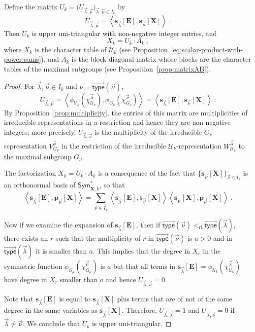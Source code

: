 \documentclass[ALCO,Unicode]{cedram}
\newcommand{\vtype}{\overrightarrow{\mathsf{type}}}
\newcommand{\XXX}{\mathbf{X}}
\newcommand{\EEE}{\mathbf{E}}
\begin{document}
\begin{prop}\label{prop:UAfactorization}
Define the matrix
$U_k = \big( U_{ \vec{\lambda}, \vec{\mu}} \big)_{\vec{\lambda}, \vec{\mu}\in I_k}$
by
\[
U_{ \vec{\lambda}, \vec{\mu}} = \left<
\mathbf{s}_{\vec{\lambda}}[\EEE], \mathbf{s}_{\vec{\mu}}[\XXX] \right>~.
\]
Then $U_k$ is upper uni-triangular with non-negative integer entries, and
\[
X_k = U_k \cdot A_k~,
\]
where $X_k$ is the character table of $\mathcal{U}_k$ \textup{(}see Proposition~\ref{eq:scalar-product-with-power-sums}\textup{)},
and $A_k$ is the block diagonal matrix whose blocks
are the character tables of the maximal subgroups \textup{(}see Proposition~\ref{prop:matrixAB}\textup{)}.
\end{prop}

\begin{proof}
For $\vec{\lambda}, \vec{\nu} \in I_k$ and $\nu = \vtype(\vec{\nu})$,
\[
U_{\vec{\lambda}, \vec{\nu}} =
\left< \phi_{\mathcal{U}_k}(\chi^{\vec{\lambda}}_{\mathcal{U}_k}),
\phi_{G_\nu}(\chi^{\vec{\nu}}_{G_\nu}) \right>
=
\left< \mathbf{s}_{\vec{\lambda}}[\EEE], \mathbf{s}_{\vec{\nu}}[\XXX] \right>~.
\]
By Proposition~\ref{prop:multiplicity},
the entries of this matrix are multiplicities of irreducible representations in a
restriction and hence they are non-negative integers; more precisely,
$U_{\vec{\lambda},\vec{\nu}}$ is the multiplicity of the irreducible
$G_\nu$-representation $V^{\vec{\nu}}_{G_\nu}$ in the restriction of
the irreducible $\mathcal{U}_k$-representation
$W^{\vec{\lambda}}_{\mathcal{U}_k}$ to the maximal subgroup $G_{\nu}$.

The factorization $X_k = U_k \cdot A_k$ is a consequence of the fact
that $\{ \mathbf{s}_{\vec{\nu}}[\XXX] \}_{\vec{\nu} \in I_k}$ is an orthonormal
basis of $\mathsf{Sym}^{\ast}_{\XXX,k}$, so that
\[
\left< \mathbf{s}_{\vec{\lambda}}[\EEE], \mathbf{p}_{\vec{\mu}}[\XXX] \right> =
\sum_{\vec{\nu} \in I_k}
\left< \mathbf{s}_{\vec{\lambda}}[\EEE], \mathbf{s}_{\vec{\nu}}[\XXX] \right>
\left< \mathbf{s}_{\vec{\nu}}[\XXX], \mathbf{p}_{\vec{\mu}}[\XXX] \right>~.
\]

Now if we examine the expansion of
$\mathbf{s}_{\vec{\lambda}}[\EEE]$,
then if $\vtype(\vec{\nu}) <_{\mathrm{rl}} \vtype(\vec{\lambda})$, there
exists an $r$ such that the multiplicity of $r$ in $\vtype(\vec{\nu})$
is $a>0$ and in $\vtype(\vec{\lambda})$ it is smaller than $a$.
This implies that the degree in $X_r$ in
the symmetric function $\phi_{G_\mu}(\chi^{\vec{\mu}}_{G_\mu})$ is
$a$ but that all terms in
$\mathbf{s}_{\vec{\lambda}}[\EEE] = \phi_{\mathcal{U}_k}(\chi^{\vec{\lambda}}_{\mathcal{U}_k})$
have degree in $X_r$ smaller than $a$ and hence $U_{\vec{\lambda},\vec{\nu}} = 0$.

Note that $\mathbf{s}_{\vec{\lambda}}[\EEE]$ is equal to $\mathbf{s}_{\vec{\lambda}}[\XXX]$ plus
terms that are of not of the same degree in the same variables
as $\mathbf{s}_{\vec{\lambda}}[\XXX]$.  Therefore,
$U_{\vec{\lambda},\vec{\lambda}} = 1$ and
$U_{\vec{\lambda},\vec{\nu}} = 0$ if $\vec{\lambda} \neq \vec{\nu}$.
We conclude that $U_k$ is upper uni-triangular.
\end{proof}
\end{document}
